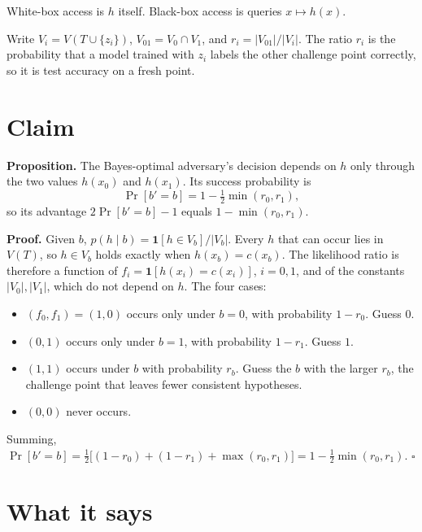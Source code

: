 \documentclass[
]{article}
\providecommand{\tightlist}{%
  \setlength{\itemsep}{0pt}\setlength{\parskip}{0pt}}
\begin{document}
White-box access is \(h\) itself. Black-box access is queries
\(x \mapsto h(x)\).

Write \(V_i = V(T \cup \{z_i\})\), \(V_{01} = V_0 \cap V_1\), and
\(r_i = |V_{01}| / |V_i|\). The ratio \(r_i\) is the probability that a
model trained with \(z_i\) labels the other challenge point correctly,
so it is test accuracy on a fresh point.

\section{Claim}\label{claim}

\textbf{Proposition.} The Bayes-optimal adversary's decision depends on
\(h\) only through the two values \(h(x_0)\) and \(h(x_1)\). Its success
probability is \[\Pr[b' = b] = 1 - \tfrac{1}{2}\min(r_0, r_1),\] so its
advantage \(2\Pr[b'=b]-1\) equals \(1 - \min(r_0, r_1)\).

\textbf{Proof.} Given \(b\),
\(p(h \mid b) = \mathbf{1}[h \in V_b] / |V_b|\). Every \(h\) that can
occur lies in \(V(T)\), so \(h \in V_b\) holds exactly when
\(h(x_b) = c(x_b)\). The likelihood ratio is therefore a function of
\(f_i = \mathbf{1}[h(x_i) = c(x_i)]\), \(i = 0, 1\), and of the
constants \(|V_0|, |V_1|\), which do not depend on \(h\). The four
cases:

\begin{itemize}
\tightlist
\item
  \((f_0, f_1) = (1, 0)\) occurs only under \(b = 0\), with probability
  \(1 - r_0\). Guess \(0\).
\item
  \((0, 1)\) occurs only under \(b = 1\), with probability \(1 - r_1\).
  Guess \(1\).
\item
  \((1, 1)\) occurs under \(b\) with probability \(r_b\). Guess the
  \(b\) with the larger \(r_b\), the challenge point that leaves fewer
  consistent hypotheses.
\item
  \((0, 0)\) never occurs.
\end{itemize}

Summing,
\(\Pr[b'=b] = \tfrac{1}{2}\big[(1-r_0) + (1-r_1) + \max(r_0,r_1)\big] = 1 - \tfrac12 \min(r_0,r_1)\).
\(\square\)

\section{What it says}\label{what-it-says}
\end{document}
